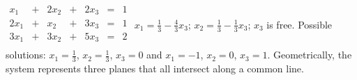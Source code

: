 {$\begin{array}{ccccccc}
x_1&+&2x_2&+&2x_3&=&1\\
2x_1&+&x_2&+&3x_3&=&1\\
3x_1&+&3x_2&+&5x_3&=&2\\
\end{array}$}
{$x_1=\frac13-\frac43x_3$; $x_2=\frac13-\frac13x_3$; $x_3$ is free. Possible solutions: $x_1 = \frac13$, $x_2=\frac13$, $x_3=0$ and $x_1 = -1$, $x_2 = 0$, $x_3=1$. Geometrically, the system represents three planes that all intersect along a common line.}
